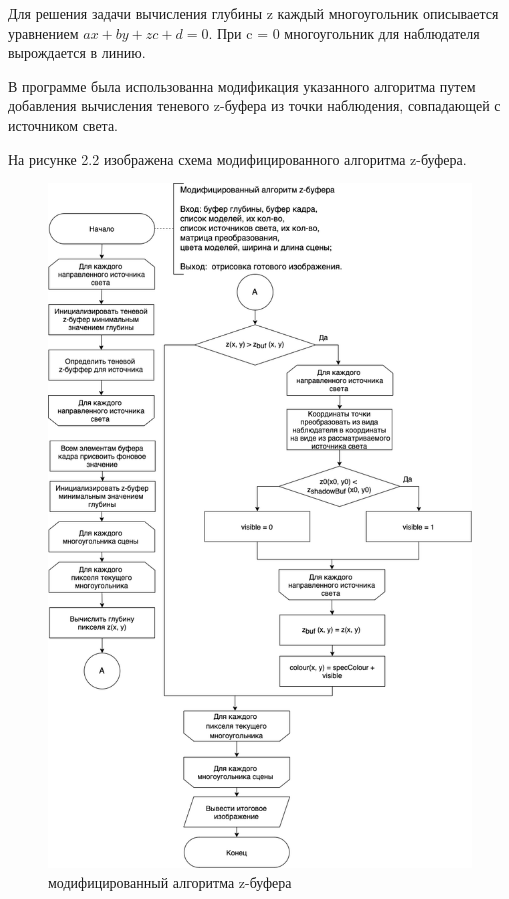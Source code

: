 Для решения задачи вычисления глубины z каждый многоугольник описывается уравнением $ax + by + zc + d = 0$. При c = 0 многоугольник для наблюдателя вырождается в линию.

В программе была использованна модификация указанного алгоритма путем добавления вычисления теневого z-буфера из точки наблюдения, совпадающей с источником света.

На рисунке 2.2 изображена схема модифицированного алгоритма z-буфера.
\begin{figure}[H]
	\begin{center}
		\includegraphics[scale=0.45]{images/alg}
	\end{center}
	\captionsetup{justification=centering}
	\caption{модифицированный алгоритма z-буфера}
	\label{img:s1}
\end{figure}


